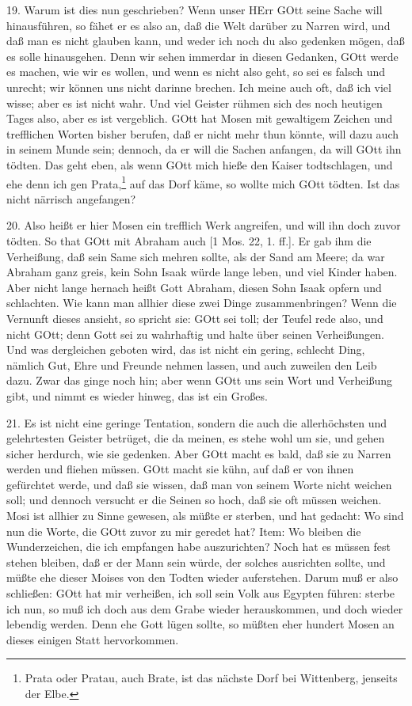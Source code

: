 19. Warum ist dies nun geschrieben? Wenn unser HErr GOtt seine Sache will hinausführen, so fähet er es also an, daß die Welt darüber zu Narren wird, und daß man es nicht glauben kann, und weder ich noch du also gedenken mögen, daß es solle hinausgehen. Denn wir sehen immerdar in diesen Gedanken, GOtt werde es machen, wie wir es wollen, und wenn es nicht
also geht, so sei es falsch und unrecht; wir können uns nicht darinne brechen. Ich meine auch oft, daß ich viel wisse; aber es ist nicht wahr. Und viel Geister rühmen sich des noch heutigen Tages also, aber es ist vergeblich. GOtt hat Mosen mit gewaltigem Zeichen und trefflichen Worten bisher berufen, daß er nicht mehr thun könnte, will dazu auch in seinem Munde sein; dennoch, da er will die Sachen anfangen, da will GOtt ihn tödten. Das geht eben, als wenn GOtt mich hieße den Kaiser todtschlagen, und ehe denn ich gen Prata,\footnote{Prata oder Pratau, auch Brate, ist das nächste Dorf bei Wittenberg, jenseits der Elbe.} auf das Dorf käme, so wollte mich GOtt tödten. Ist das nicht närrisch angefangen?

20. Also heißt er hier Mosen ein trefflich Werk angreifen, und will ihn doch zuvor tödten. So that GOtt mit Abraham auch [1 Mos. 22, 1. ff.]. Er gab ihm die Verheißung, daß sein Same sich mehren sollte, als der Sand am Meere; da war Abraham ganz greis, kein Sohn Isaak würde lange leben, und viel Kinder haben. Aber nicht lange hernach heißt Gott Abraham, diesen Sohn Isaak opfern und schlachten. Wie kann man allhier diese zwei Dinge zusammenbringen? Wenn die Vernunft dieses ansieht, so spricht sie: GOtt sei toll; der Teufel rede also, und nicht GOtt; denn Gott sei zu wahrhaftig und halte über seinen Verheißungen. Und was dergleichen geboten wird, das ist nicht ein gering, schlecht Ding, nämlich Gut, Ehre und Freunde nehmen lassen, und auch zuweilen den Leib dazu. Zwar das ginge noch hin; aber wenn GOtt uns sein Wort und Verheißung gibt, und nimmt es wieder hinweg, das ist ein Großes.

21. Es ist nicht eine geringe Tentation, sondern die auch die allerhöchsten und gelehrtesten Geister betrüget, die da meinen, es stehe wohl um sie, und gehen sicher herdurch, wie sie gedenken. Aber GOtt macht es bald, daß sie zu Narren werden und fliehen müssen. GOtt macht sie kühn, auf daß er von ihnen gefürchtet werde, und daß sie wissen, daß man von seinem Worte nicht weichen soll; und dennoch versucht er die Seinen so hoch, daß sie oft müssen weichen. Mosi ist allhier zu Sinne gewesen, als müßte er sterben, und hat gedacht: Wo sind nun die Worte, die GOtt zuvor zu mir geredet hat? Item: Wo bleiben die Wunderzeichen, die ich empfangen habe auszurichten? Noch hat es müssen fest stehen bleiben, daß er der Mann sein würde, der solches ausrichten sollte, und müßte ehe dieser Moises von den Todten wieder auferstehen. Darum muß er also schließen: GOtt hat mir verheißen, ich soll sein Volk aus Egypten führen: sterbe ich nun, so muß ich doch aus dem Grabe wieder herauskommen, und doch wieder lebendig werden. Denn ehe Gott lügen sollte, so müßten eher hundert Mosen an dieses einigen Statt hervorkommen.

